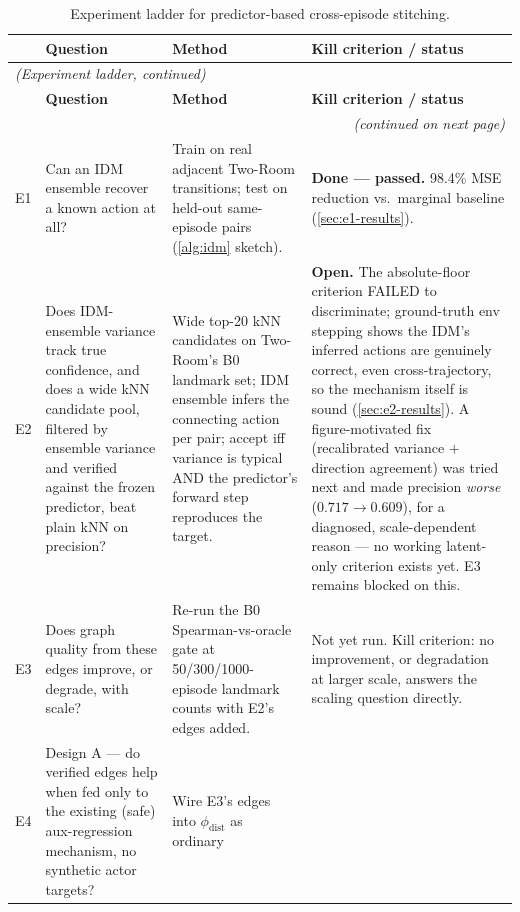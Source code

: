 \documentclass[11pt]{article}
\begin{document}
\begin{center}
\small
\begin{longtable}{@{}p{0.6cm}p{4.6cm}p{5.4cm}p{3.6cm}@{}}
\caption{Experiment ladder for predictor-based cross-episode stitching.} \\
\toprule
& \textbf{Question} & \textbf{Method} & \textbf{Kill criterion / status} \\
\midrule
\endfirsthead
\multicolumn{4}{l}{\small\itshape (Experiment ladder, continued)} \\
\toprule
& \textbf{Question} & \textbf{Method} & \textbf{Kill criterion / status} \\
\midrule
\endhead
\bottomrule
\multicolumn{4}{r}{\small\itshape (continued on next page)} \\
\endfoot
\bottomrule
\endlastfoot
E1 & Can an IDM ensemble recover a known action at all? & Train on real adjacent Two-Room
transitions; test on held-out same-episode pairs (\cref{alg:idm} sketch). & \textcolor{cAmber}
{\textbf{Done --- passed.}} 98.4\% MSE reduction vs.\ marginal baseline
(\cref{sec:e1-results}). \\
\addlinespace
E2 & Does IDM-ensemble variance track true confidence, and does a wide kNN candidate pool,
filtered by ensemble variance and verified against the frozen predictor, beat plain kNN on
precision? & Wide top-20 kNN candidates on Two-Room's B0 landmark set; IDM ensemble infers
the connecting action per pair; accept iff variance is typical AND the predictor's forward
step reproduces the target. & \textcolor{cAmber}{\textbf{Open.}} The absolute-floor criterion
FAILED to discriminate; ground-truth env stepping shows the IDM's inferred actions are
genuinely correct, even cross-trajectory, so the mechanism itself is sound
(\cref{sec:e2-results}). A figure-motivated fix (recalibrated variance $+$ direction
agreement) was tried next and made precision \emph{worse} ($0.717\to0.609$), for a diagnosed,
scale-dependent reason --- no working latent-only criterion exists yet. E3 remains blocked
on this. \\
\addlinespace
E3 & Does graph quality from these edges improve, or degrade, with scale? & Re-run the B0
Spearman-vs-oracle gate at 50/300/1000-episode landmark counts with E2's edges added. & Not yet
run. Kill criterion: no improvement, or degradation at larger scale, answers the scaling
question directly. \\
\addlinespace
E4 & Design A --- do verified edges help when fed only to the existing (safe) aux-regression
mechanism, no synthetic actor targets? & Wire E3's edges into $\phi_{\mathrm{dist}}$ as ordinary

\end{longtable}
\end{center}
\end{document}
